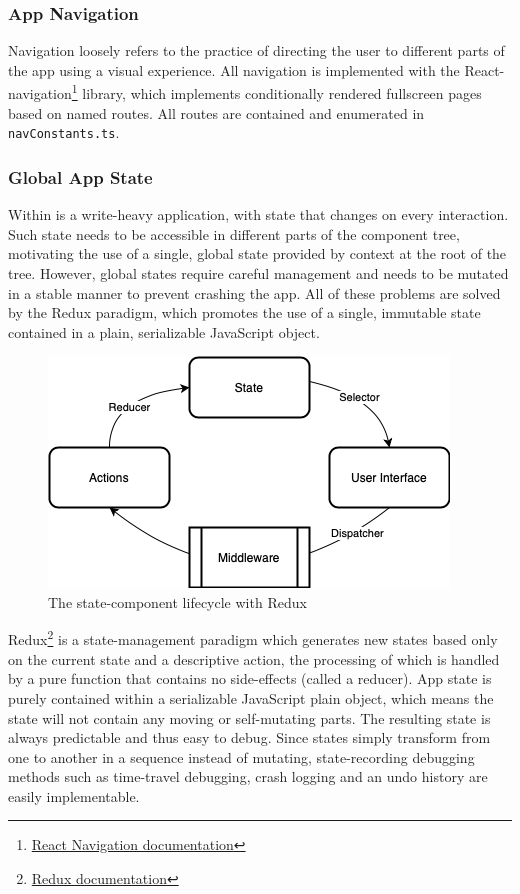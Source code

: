 \subsubsection{App Navigation}
Navigation loosely refers to the practice of directing the user to different parts of the app using a visual experience. All navigation is implemented with the React-navigation\footnote{\href{https://reactnavigation.org}{React Navigation documentation}} library, which implements conditionally rendered fullscreen pages based on named routes. All routes are contained and enumerated in \texttt{navConstants.ts}.

\subsubsection{Global App State}
Within is a write-heavy application, with state that changes on every interaction. Such state needs to be accessible in different parts of the component tree, motivating the use of a single, global state provided by context at the root of the tree. However, global states require careful management and needs to be mutated in a stable manner to prevent crashing the app. All of these problems are solved by the Redux paradigm, which promotes the use of a single, immutable state contained in a plain, serializable JavaScript object.

\begin{figure}[h]
    \begin{center}
        \includegraphics[scale=0.55]{images/redux_state.png}
    \end{center}
    \caption{The state-component lifecycle with Redux}
    \label{fig:redux_state}
\end{figure}

Redux\footnote{\href{https://redux.js.org/usage/usage-with-TypeScript}{Redux documentation}} is a state-management paradigm which generates new states based only on the current state and a descriptive action, the processing of which is handled by a pure function that contains no side-effects (called a reducer). App state is purely contained within a serializable JavaScript plain object, which means the state will not contain any moving or self-mutating parts. The resulting state is always predictable and thus easy to debug. Since states simply transform from one to another in a sequence instead of mutating, state-recording debugging methods such as time-travel debugging, crash logging and an undo history are easily implementable.

